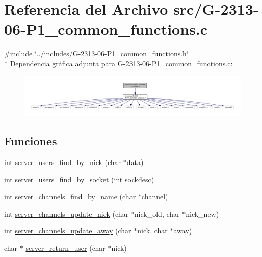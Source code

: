 \hypertarget{G-2313-06-P1__common__functions_8c}{}\section{Referencia del Archivo src/\+G-\/2313-\/06-\/\+P1\+\_\+common\+\_\+functions.c}
\label{G-2313-06-P1__common__functions_8c}
{\ttfamily \#include \char`\"{}../includes/\+G-\/2313-\/06-\/\+P1\+\_\+common\+\_\+functions.\+h\char`\"{}}\\*
Dependencia gráfica adjunta para G-\/2313-\/06-\/\+P1\+\_\+common\+\_\+functions.c\+:\nopagebreak
\begin{figure}[H]
\begin{center}
\leavevmode
\includegraphics[width=350pt]{G-2313-06-P1__common__functions_8c__incl}
\end{center}
\end{figure}
\subsection*{Funciones}
\begin{DoxyCompactItemize}
\item 
int \hyperlink{G-2313-06-P1__common__functions_8c_a61cca6f1a1adeb81f722ecc2ff35aab5}{server\+\_\+users\+\_\+find\+\_\+by\+\_\+nick} (char $\ast$data)
\item 
int \hyperlink{G-2313-06-P1__common__functions_8c_a485e68f66db6ae4b7297d99c32afe30a}{server\+\_\+users\+\_\+find\+\_\+by\+\_\+socket} (int sockdesc)
\item 
int \hyperlink{G-2313-06-P1__common__functions_8c_a875ae5278d95716b494b26f96cf4ae6e}{server\+\_\+channels\+\_\+find\+\_\+by\+\_\+name} (char $\ast$channel)
\item 
int \hyperlink{G-2313-06-P1__common__functions_8c_ae8a282d9cdfc8187b8e74e368bc56d92}{server\+\_\+channels\+\_\+update\+\_\+nick} (char $\ast$nick\+\_\+old, char $\ast$nick\+\_\+new)
\item 
int \hyperlink{G-2313-06-P1__common__functions_8c_af9aeb632d55a4cbbe842ab97001b5128}{server\+\_\+channels\+\_\+update\+\_\+away} (char $\ast$nick, char $\ast$away)
\item 
char $\ast$ \hyperlink{G-2313-06-P1__common__functions_8c_a230bf24ab7ae18d2e81ebc1d3575a6ad}{server\+\_\+return\+\_\+user} (char $\ast$nick)
\end{DoxyCompactItemize}


